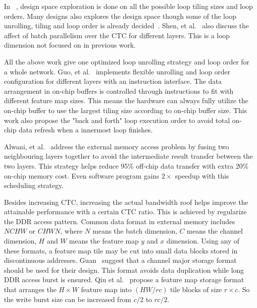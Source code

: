 In ~\cite{zhang2015optimizing, ma2017optimizing}, design space exploration is done on all the possible loop tiling sizes and loop orders. Many designs also explores the design space though some of the loop unrolling, tiling and loop order is already decided~\cite{motamedi2016design, qiu2016going}. Shen, et al.~\cite{shen2017escher} also discuss the affect of batch parallelism over the CTC for different layers. This is a loop dimension not focused on in previous work.

All the above work give one optimized loop unrolling strategy and loop order for a whole network. Guo, et al.~\cite{guo2017angel} implements flexible unrolling and loop order configuration for different layers with an instruction interface. The data arrangement in on-chip buffers is controlled through instructions to fit with different feature map sizes. This means the hardware can always fully utilize the on-chip buffer to use the largest tiling size according to on-chip buffer size. This work also propose the "back and forth" loop execution order to avoid total on-chip data refresh when a innermost loop finishes.

Alwani, et al.~\cite{alwani2016fused} address the external memory access problem by fusing two neighbouring layers together to avoid the intermediate result transfer between the two layers. This strategy helps reduce 95\% off-chip data transfer with extra 20\% on-chip memory cost. Even software program gains $2\times$ speedup with this scheduling strategy.

Besides increasing CTC, increasing the actual bandwidth roof helps improve the attainable performance with a certain CTC ratio. This is achieved by regularize the DDR access pattern. Common data format in external memory includes $NCHW$ or $CHWN$, where $N$ means the batch dimension, $C$ means the channel dimension, $H$ and $W$ means the feature map $y$ and $x$ dimension. Using any of these formats, a feature map tile may be cut into small data blocks stored in discontinuous addresses. Guan~\cite{guan2017fp} suggest that a channel major storage format should be used for their design. This format avoids data duplication while long DDR access burst is ensured. Qiu et al.~\cite{qiu2016going} propose a feature map storage format that arranges the $H\times W$ feature map into $(HW/rc)$ tile blocks of size $r\times c$. So the write burst size can be increased from $c/2$ to $rc/2$.
